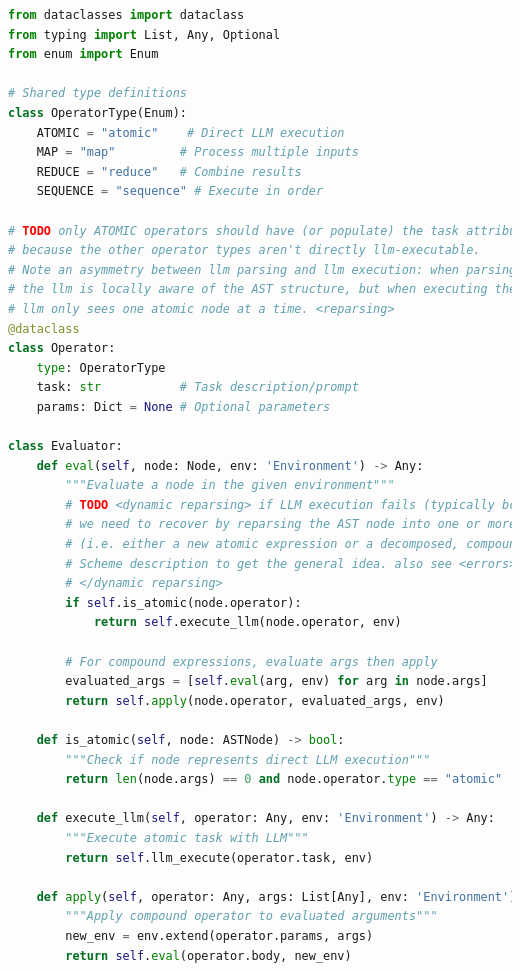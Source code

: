 \documentclass{article}
\begin{document}
\begin{lstlisting}[language=Python]
from dataclasses import dataclass
from typing import List, Any, Optional
from enum import Enum

# Shared type definitions
class OperatorType(Enum):
    ATOMIC = "atomic"    # Direct LLM execution
    MAP = "map"         # Process multiple inputs
    REDUCE = "reduce"   # Combine results
    SEQUENCE = "sequence" # Execute in order

# TODO only ATOMIC operators should have (or populate) the task attribute,
# because the other operator types aren't directly llm-executable. 
# Note an asymmetry between llm parsing and llm execution: when parsing, 
# the llm is locally aware of the AST structure, but when executing the 
# llm only sees one atomic node at a time. <reparsing>
@dataclass
class Operator:
    type: OperatorType
    task: str           # Task description/prompt
    params: Dict = None # Optional parameters

class Evaluator:
    def eval(self, node: Node, env: 'Environment') -> Any:
        """Evaluate a node in the given environment"""
        # TODO <dynamic reparsing> if LLM execution fails (typically bc of resource exhaustion or verification failure)
        # we need to recover by reparsing the AST node into one or more rewritten subtrees 
        # (i.e. either a new atomic expression or a decomposed, compound expression). See the 
        # Scheme description to get the general idea. also see <errors>
        # </dynamic reparsing>
        if self.is_atomic(node.operator):
            return self.execute_llm(node.operator, env)
            
        # For compound expressions, evaluate args then apply
        evaluated_args = [self.eval(arg, env) for arg in node.args]
        return self.apply(node.operator, evaluated_args, env)
    
    def is_atomic(self, node: ASTNode) -> bool:
        """Check if node represents direct LLM execution"""
        return len(node.args) == 0 and node.operator.type == "atomic"
    
    def execute_llm(self, operator: Any, env: 'Environment') -> Any:
        """Execute atomic task with LLM"""
        return self.llm_execute(operator.task, env)
    
    def apply(self, operator: Any, args: List[Any], env: 'Environment') -> Any:
        """Apply compound operator to evaluated arguments"""
        new_env = env.extend(operator.params, args)
        return self.eval(operator.body, new_env)
\end{lstlisting}
\end{document}

